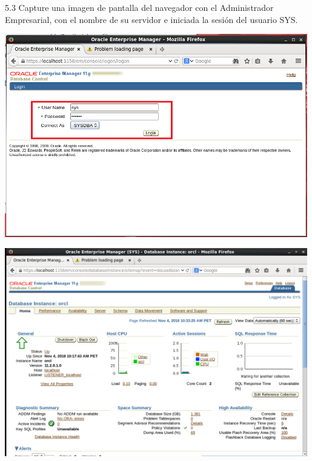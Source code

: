 5.3 Capture una imagen de pantalla del navegador con el Administrador Empresarial, con el nombre de su servidor e iniciada la sesión del usuario SYS.
	\begin{center}
		\includegraphics[width=13.2cm]{./Imagenes/92} 
	\end{center}
	
	\begin{center}
		\includegraphics[width=13.2cm]{./Imagenes/93} 
	\end{center}